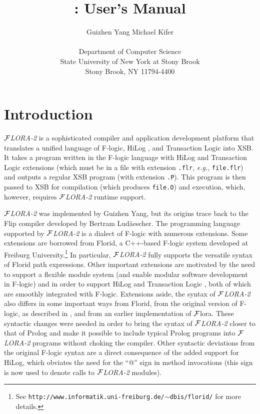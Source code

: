 \documentclass[11pt]{article}
\title{\FLORA: User's Manual}
\author{
  {Guizhen Yang
  \hspace{3cm}
  Michael Kifer}
  \\\\
  Department of Computer Science\\
  State University of New York at Stony Brook\\
  Stony Brook, NY 11794-4400
  }
\newcommand{\FLIP}{{\mbox{\sc Flip}}\xspace}
\newcommand{\FLORA}{{\mbox{${\cal F}${\small\it LORA}\rm\emph{-2}}}\xspace}
\newcommand{\FLORAone}{{\mbox{${\cal F}${\sc lora}}}\xspace}
\newcommand{\FLORID}{{\mbox{\sc Florid}}\xspace}
\newcommand{\fl}{\mbox{F-logic}\xspace}
\begin{document}
\maketitle
\thispagestyle{empty}

\newpage
{}
\setcounter{page}{1}

\tableofcontents

\newpage

\setcounter{page}{1}


\section{Introduction}

\FLORA is a sophisticated compiler and application development platform
that translates a unified language of \fl \cite{KLW95}, HiLog
\cite{hilog-jlp}, and Transaction Logic \cite{trans-tcs94} into XSB. It
takes a program written in the \fl language with HiLog and Transaction
Logic extensions (which must be in a file with extension {\tt .flr}, {\it
  e.g.}, {\tt file.flr}) and outputs a regular XSB program (with extension
{\tt .P}).  This program is then passed to XSB for compilation (which
produces {\tt file.O}) and execution, which, however, requires \FLORA
runtime support.

\FLORA was implemented by Guizhen Yang, but its origins trace back to the
\FLIP compiler developed by Bertram Lud\"aescher.  The programming language
supported by \FLORA is a dialect of \fl with numerous extensions.  Some
extensions are borrowed from \FLORID, a C++-based \fl system developed at
Freiburg University.\footnote{
  See {\tt http://www.informatik.uni-freiburg.de/$\sim$dbis/florid/} for more
  details.
  }
In particular, \FLORA fully supports the versatile syntax of \FLORID path
expressions. Other important extensions are motivated by the need to
support a flexible module system (and enable modular software development
in \fl) and in order to support HiLog \cite{hilog-jlp} and Transaction
Logic \cite{trans-dbpl93,trans-iclp93,trans-tcs94}, both of which are
smoothly integrated with \fl. Extensions aside, the syntax of \FLORA also
differs in some important ways from \FLORID, from the original version of
\fl, as described in \cite{KLW95}, and from an earlier implementation
of \FLORAone. These syntactic changes were needed in order to bring the
syntax of \FLORA closer to that of Prolog and make it possible to include
typical Prolog programs into \FLORA programs without choking the compiler.
Other syntactic deviations from the original F-logic syntax are a direct
consequence of the added support for HiLog, which obviates the need for the
``@'' sign in method invocations (this sign is now used to denote calls to
\FLORA modules).
\end{document}
